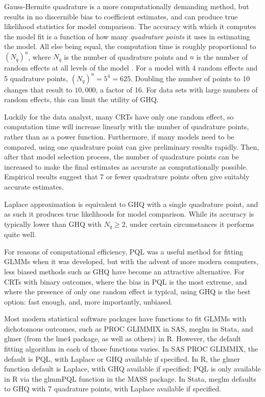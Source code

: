 \documentclass{article}
\begin{document}
\begin{flushleft}
Gauss-Hermite quadrature is a more computationally demanding method, but results in no discernible bias to coefficient estimates, and can produce true likelihood statistics for model comparison. The accuracy with which it computes the model fit is a function of how many \textit{quadrature points} it uses in estimating the model. All else being equal, the computation time is roughly proportional to $(N_q)^u$, where $N_q$ is the number of quadrature points and $u$ is the number of random effects at all levels of the model \cite{statacorp_stata_2017}\cite{pinheiro_efficient_2006}. For a model with 4 random effects and 5 quadrature points, $(N_q)^u = 5^4 = 625$. Doubling the number of points to 10 changes that result to $10,000$, a factor of 16. For data sets with large numbers of random effects, this can limit the utility of GHQ.

Luckily for the data analyst, many CRTs have only one random effect, so computation time will increase linearly with the number of quadrature points, rather than as a power function. Furthermore, if many models need to be compared, using one quadrature point can give preliminary results rapidly. Then, after that model selection process, the number of quadrature points can be increased to make the final estimates as accurate as computationally possible. Empirical results suggest that 7 or fewer quadrature points often give suitably accurate estimates\cite{pinheiro_approximations_1995}.

Laplace approximation is equivalent to GHQ with a single quadrature point\cite{liu_note_1994}, and as such it produces true likelihoods for model comparison. While its accuracy is typically lower than GHQ with $N_q\geq2$, under certain circumstances it performs quite well\cite{liu_note_1994}.

For reasons of computational efficiency, PQL was a useful method for fitting GLMMs when it was developed, but with the advent of more modern computers, less biased methods such as GHQ have become an attractive alternative. For CRTs with binary outcomes, where the bias in PQL is the most extreme\cite{ng_estimation_2006}\cite{lin_estimation_2007}, and where the presence of only one random effect is typical, using GHQ is the best option: fast enough, and, more importantly, unbiased.

Most modern statistical software packages have functions to fit GLMMs with dichotomous outcomes, such as PROC GLIMMIX in SAS, meglm in Stata, and glmer (from the lme4 package, as well as others) in R. However, the default fitting algorithm in each of those functions varies. In SAS PROC GLIMMIX, the default is PQL, with Laplace or GHQ available if specified. In R, the glmer function default is Laplace, with GHQ available if specified; PQL is only available in R via the glmmPQL function in the MASS package. In Stata, meglm defaults to GHQ with 7 quadrature points, with Laplace available if specified.


\end{flushleft}
\end{document}
